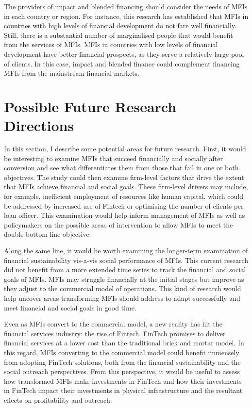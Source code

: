 \documentclass[a4paper, nobind]{templates/ociamthesis}
\begin{document}
The providers of impact and blended financing should consider the needs of MFIs in each country or region. For instance, this research has established that MFIs in countries with high levels of financial development do not fare well financially. Still, there is a substantial number of marginalised people that would benefit from the services of MFIs. MFIs in countries with low levels of financial development have better financial prospects, as they serve a relatively large pool of clients. In this case, impact and blended finance could complement financing MFIs from the mainstream financial markets.

\hypertarget{possible-future-research-directions}{%
\section{Possible Future Research Directions}\label{possible-future-research-directions}}

In this section, I describe some potential areas for future research. First, it would be interesting to examine MFIs that succeed financially and socially after conversion and see what differentiates them from those that fail in one or both objectives. The study could then examine firm-level factors that drive the extent that MFIs achieve financial and social goals. These firm-level drivers may include, for example, inefficient employment of resources like human capital, which could be addressed by increased use of Fintech or optimising the number of clients per loan officer. This examination would help inform management of MFIs as well as policymakers on the possible areas of intervention to allow MFIs to meet the double bottom line objective.

Along the same line, it would be worth examining the longer-term examination of financial sustainability vis-a-vis social performance of MFIs. This current research did not benefit from a more extended time series to track the financial and social goals of MFIs. MFIs may struggle financially at the initial stages but improve as they adjust to the commercial model of operations. This kind of research would help uncover areas transforming MFIs should address to adapt successfully and meet financial and social goals in good time.

Even as MFIs convert to the commercial model, a new reality has hit the financial services industry: the rise of Fintech. FinTech promises to deliver financial services at a lower cost than the traditional brick and mortar model. In this regard, MFIs converting to the commercial model could benefit immensely from adopting FinTech solutions, both from the financial sustainability and the social outreach perspectives. From this perspective, it would be useful to assess how transformed MFIs make investments in FinTech and how their investments in FinTech impact their investments in physical infrastructure and the resultant effects on profitability and outreach.
\end{document}
